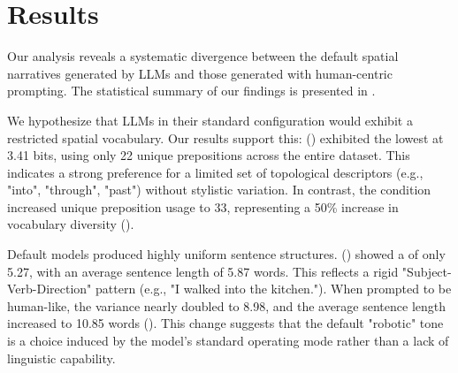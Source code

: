 \section{Results}
\label{sec:results}

Our analysis reveals a systematic divergence between the default spatial narratives generated by LLMs and those generated with human-centric prompting. The statistical summary of our findings is presented in .

\begin{table}[t]
\centering
\caption{Linguistic feature comparison across models and prompting conditions. Best results (highest variance/entropy) in \textbf{bold}.}
\label{tab:results}
\end{table}

We hypothesize that LLMs in their standard configuration would exhibit a restricted spatial vocabulary. Our results support this: \gpto (\standardprompt) exhibited the lowest \prepentropy at 3.41 bits, using only 22 unique prepositions across the entire dataset. This indicates a strong preference for a limited set of topological descriptors (e.g., "into", "through", "past") without stylistic variation. In contrast, the \humanprompt condition increased unique preposition usage to 33, representing a 50\% increase in vocabulary diversity ().

Default models produced highly uniform sentence structures. \gptom (\standardprompt) showed a \sentvar of only 5.27, with an average sentence length of 5.87 words. This reflects a rigid "Subject-Verb-Direction" pattern (e.g., "I walked into the kitchen."). When prompted to be human-like, the variance nearly doubled to 8.98, and the average sentence length increased to 10.85 words (). This change suggests that the default "robotic" tone is a choice induced by the model's standard operating mode rather than a lack of linguistic capability.


